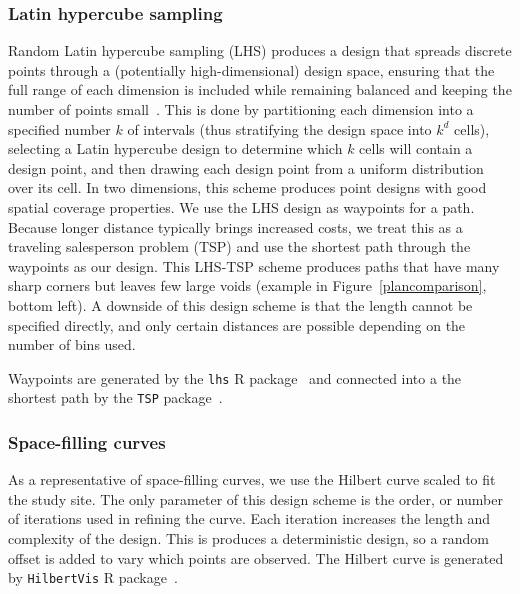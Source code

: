 \documentclass[review]{elsarticle}
\begin{document}
\subsubsection{Latin hypercube sampling}

Random Latin hypercube sampling (LHS) produces a design that spreads discrete
points through a (potentially high-dimensional) design space, ensuring that
the full range of each dimension is included while remaining balanced and
keeping the number of points small~\cite{mckayetal}. This is done by
partitioning each dimension into a specified number \(k\) of intervals (thus
stratifying the design space into \(k^{d}\) cells), selecting a Latin
hypercube design to determine which \(k\) cells will contain a design point,
and then drawing each design point from a uniform distribution over its cell.
In two dimensions, this scheme produces point designs with good spatial
coverage properties. We use the LHS design as waypoints for a path. Because
longer distance typically brings increased costs, we treat this as a traveling
salesperson problem (TSP) and use the shortest path through the waypoints as
our design. This LHS-TSP scheme produces paths that have many sharp corners but
leaves few large voids (example in Figure~\ref{plancomparison}, bottom left). A
downside of this design scheme is that the length cannot be specified directly,
and only certain distances are possible depending on the number of bins used.

Waypoints are generated by the \texttt{lhs} R package~\cite{lhs}
and connected into a the shortest path by the \texttt{TSP} package~\citep{tsp}.


\subsubsection{Space-filling curves}

As a representative of space-filling curves, we use the Hilbert curve scaled
to fit the study site. The only parameter of this design scheme is the order,
or number of iterations used in refining the curve. Each iteration increases
the length and complexity of the design. This is produces a deterministic
design, so a random offset is added to vary which points are observed. The
Hilbert curve is generated by \texttt{HilbertVis} R package~\citep{hilbertvis}.

\end{document}
